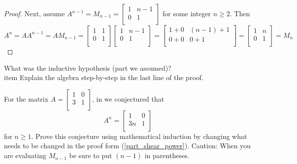 \begin{act}
\begin{actpart}
\begin{proof}
                Next, assume $A^{n-1} = M_{n-1} = \left[ \begin{array}{cc} 1 & n-1 \\ 0 & 1 \\ \end{array} \right]$ for some integer $n \ge 2$.  Then
                    $$A^n = AA^{n-1} =AM_{n-1}
                    = \left[ \begin{array}{cc} 1 & 1\\ 0 & 1 \\ \end{array} \right]\left[ \begin{array}{cc} 1 & n-1\\ 0 & 1 \\ \end{array} \right]
                    = \left[ \begin{array}{cc} 1+0 & (n-1)+1\\ 0+0 & 0+1 \\ \end{array} \right]
                    = \left[ \begin{array}{cc} 1 & n\\ 0 & 1 \\ \end{array} \right]=M_n$$
            \end{proof} 
        \item What was the inductive hypothesis (part we assumed)?
        \\item Explain the algebra step-by-step in the last line of the proof.
        \item For the matrix $A=\left[ \begin{array}{cc} 1 & 0 \\ 3 & 1 \\ \end{array} \right]$, in  we conjectured that $$A^n=\left[ \begin{array}{cc} 1 & 0 \\ 3n & 1 \\ \end{array} \right]$$ for $n \ge 1$.  Prove this conjecture using mathematical induction by changing what needs to be changed in the proof form (\ref{part_shear_power}). Caution:  When you are evaluating $M_{n-1}$ be sure to put $(n-1)$ in parentheses.
    \end{actpart}
\end{act}


